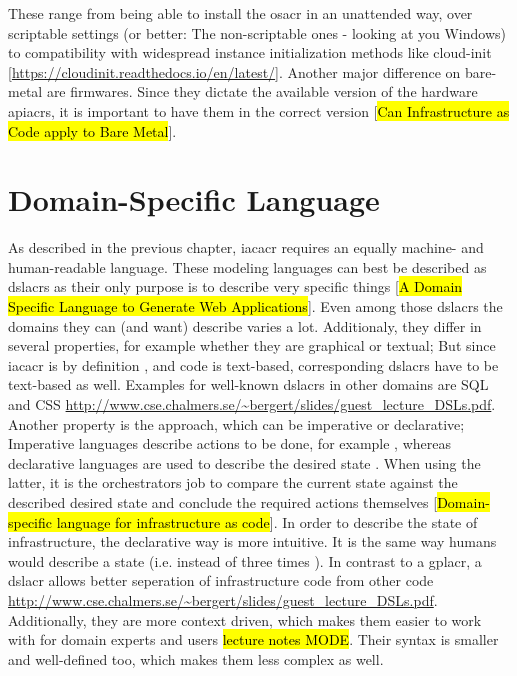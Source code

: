 These range from being able to install the \gls{osacr} in an unattended way, over scriptable settings (or better: The non-scriptable ones - looking at you Windows) to compatibility with widespread instance initialization methods like cloud-init [\url{https://cloudinit.readthedocs.io/en/latest/}].
\newline
Another major difference on bare-metal are firmwares. Since they dictate the available version of the hardware \gls{apiacr}s, it is important to have them in the correct version [\hl{Can Infrastructure as Code apply to Bare Metal}].



\section{Domain-Specific Language} %
As described in the previous chapter, \gls{iacacr} requires an equally machine- and human-readable language. These modeling languages can best be described as \gls{dslacr}s as their only purpose is to describe very specific things [\hl{A Domain Specific Language to Generate Web Applications}]. Even among those \gls{dslacr}s the domains they can (and want) describe varies a lot. Additionaly, they differ in several properties, for example whether they are graphical or textual; But since \gls{iacacr} is by definition , and code is text-based, corresponding \gls{dslacr}s have to be text-based as well. Examples for well-known \gls{dslacr}s in other domains are SQL and CSS \url{http://www.cse.chalmers.se/~bergert/slides/guest_lecture_DSLs.pdf}.
Another property is the approach, which can be imperative or declarative; Imperative languages describe actions to be done, for example , whereas declarative languages are used to describe the desired state . When using the latter, it is the orchestrators job to compare the current state against the described desired state and conclude the required actions themselves [\hl{Domain-specific language for infrastructure as code}].
In order to describe the state of infrastructure, the declarative way is more intuitive. It is the same way humans would describe a state (i.e.  instead of three times ).
\newline
In contrast to a \gls{gplacr}, a \gls{dslacr} allows better seperation of infrastructure code from other code \url{http://www.cse.chalmers.se/~bergert/slides/guest_lecture_DSLs.pdf}. Additionally, they are more context driven, which makes them easier to work with for domain experts and users \hl{lecture notes MODE}. Their syntax is smaller and well-defined too, which makes them less complex as well.
